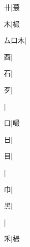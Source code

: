 \begin{multicols}{2}
{{\cjk{}{\cnsym{}　}{\cnsym{}　}卄}|{\cjk{}蕞}\par
{\cjk{}{\cnsym{}　}{\cnsym{}　}木}|{\cjk{}樶}\par
{\cjk{}厶口木}|{}\par
{\cjk{}{\cnsym{}　}{\cnsym{}　}酉}|{}\par
{\cjk{}{\cnsym{}　}{\cnsym{}　}石}|{}\par
{\cjk{}{\cnsym{}　}{\cnsym{}　}歹}|{}\par
{}|{}\par
{\cjk{}{\cnsym{}　}{\cnsym{}　}口}|{\cjk{}嘬}\par
{\cjk{}{\cnsym{}　}{\cnsym{}　}日}|{}\par
{\cjk{}{\cnsym{}　}{\cnsym{}　}目}|{}\par
{}|{}\par
{\cjk{}{\cnsym{}　}{\cnsym{}　}巾}|{}\par
{\cjk{}{\cnsym{}　}{\cnsym{}　}黑}|{}\par
{}|{}\par
{\cjk{}{\cnsym{}　}{\cnsym{}　}禾}|{\cjk{}穝}\par
}
\end{multicols}

